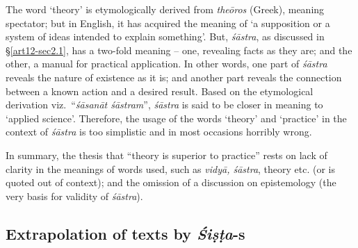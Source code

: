 The word `theory' is etymologically derived from {\sl theōros} (Greek), meaning spectator; but in English, it has acquired the meaning of `a supposition or a system of ideas intended to explain something'. But, {\sl śāstra}, as discussed in \S\ref{art12-sec2.1}, has a two-fold meaning -- one, revealing facts as they are; and the other, a manual for practical application. In other words, one part of {\sl śāstra} reveals the nature of existence as it is; and another part reveals the connection between a known action and a desired result. Based on the etymological derivation viz.\ ``{\sl śāsanāt śāstram}'', {\sl śāstra} is said to be closer in meaning to `applied science'. Therefore, the usage of the words ‘theory’ and ‘practice’ in the context of {\sl śāstra} is too simplistic and in most occasions horribly wrong. 

In summary, the thesis that ``theory is superior to practice'' rests on lack of clarity in the meanings of words used, such as {\sl vidyā, śāstra}, theory etc. (or is quoted out of context); and the omission of a discussion on epistemology (the very basis for validity of {\sl śāstra}). \\[-18pt]

\subsection{Extrapolation of texts by {{\sl\bfseries Śiṣṭa}\relax}-s}\label{art12-sec3.6}

